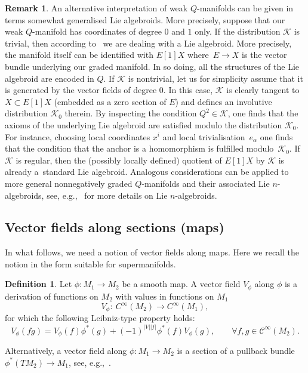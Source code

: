 \documentclass[pdftex]{sigma}
\numberwithin{equation}{section}
\theoremstyle{definition}
\newtheorem{Definition}[Theorem]{Definition}
\newtheorem{Remark}[Theorem]{Remark}
\newcommand{\p}[1]{|#1|}
\newcommand{\cC}{\mathcal{C}}
\def\cK{\mathcal{K}}
\begin{document}
\begin{Remark}
An alternative interpretation of weak $Q$-manifolds can be given in terms somewhat generalised Lie algebroids. More precisely, suppose that our weak $Q$-manifold has coordinates of degree $0$ and $1$ only. If the distribution $\cK$ is trivial, then according to~\cite{Vaintrob:1997} we are dealing with a Lie algebroid. More precisely, the manifold itself can be identified with $E[1]X$ where~${E \to X}$ is the vector bundle underlying our graded manifold. In so doing, all the structures of the Lie algebroid are encoded in $Q$. If $\cK$ is nontrivial, let us for simplicity assume that it is generated by the vector fields of degree $0$. In this case, $\cK$ is clearly tangent to $X \subset E[1]X$ (embedded as a zero section of $E$) and defines an involutive distribution $\cK_0$ therein.
By inspecting the condition $Q^2\in \cK$,
one finds that the axioms of the underlying Lie algebroid are satisfied modulo the distribution $\cK_0$. For instance, choosing local coordinates $x^i$ and local trivialisation~$e_\alpha$
one finds that the condition that the anchor is a homomorphism is fulfilled modulo~$\cK_0$. If~$\cK$ is regular, then the (possibly locally defined) quotient of $E[1]X$ by $\cK$ is already a~standard Lie algebroid. Analogous considerations can be applied to more general nonnegatively graded $Q$-manifolds and their associated Lie $n$-algebroids, see, e.g.,~\cite{Bonavolonta:2012fh,Severa:2001tze} for more details on Lie $n$-algebroids.
\end{Remark}

\subsection{Vector fields along sections (maps)}

In what follows, we need a notion of vector fields along maps. Here we recall the notion in the form suitable for supermanifolds.
\begin{Definition}
 Let $\phi\colon M_1\rightarrow M_2$ be a smooth map. A vector field $V_{\phi}$ along $\phi$ is a derivation of functions on $M_2$ with values in functions on $M_1$
 \begin{equation*}
 V_{\phi}\colon\ C^{\infty}(M_2)\rightarrow C^{\infty}(M_1),
 \end{equation*}
 for which the following Leibniz-type property holds:
 \begin{equation}\label{vam}
 V_{\phi}(fg)= V_{\phi}(f)\phi^*(g)+(-1)^{\p{V}\p{f}}\phi^*(f) V_{\phi}(g), \qquad \forall f,g\in \cC^{\infty}(M_2).
 \end{equation}
\end{Definition}
Alternatively, a vector field along $\phi\colon M_1\rightarrow M_2$ is a section of a pullback bundle $\phi^*(TM_2)\rightarrow M_1$, see, e.g.,~\cite{Lee2013}.
\end{document}
